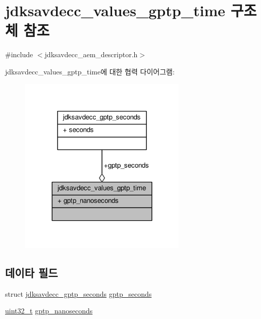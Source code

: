 \hypertarget{structjdksavdecc__values__gptp__time}{}\section{jdksavdecc\+\_\+values\+\_\+gptp\+\_\+time 구조체 참조}
\label{structjdksavdecc__values__gptp__time}


{\ttfamily \#include $<$jdksavdecc\+\_\+aem\+\_\+descriptor.\+h$>$}



jdksavdecc\+\_\+values\+\_\+gptp\+\_\+time에 대한 협력 다이어그램\+:
\nopagebreak
\begin{figure}[H]
\begin{center}
\leavevmode
\includegraphics[width=228pt]{structjdksavdecc__values__gptp__time__coll__graph}
\end{center}
\end{figure}
\subsection*{데이타 필드}
\begin{DoxyCompactItemize}
\item 
struct \hyperlink{structjdksavdecc__gptp__seconds}{jdksavdecc\+\_\+gptp\+\_\+seconds} \hyperlink{structjdksavdecc__values__gptp__time_a188b5eb829d9cabad72f2977aa72be85}{gptp\+\_\+seconds}
\item 
\hyperlink{parse_8c_a6eb1e68cc391dd753bc8ce896dbb8315}{uint32\+\_\+t} \hyperlink{structjdksavdecc__values__gptp__time_a5365958d411fe32d294129809036c617}{gptp\+\_\+nanoseconds}
\end{DoxyCompactItemize}



